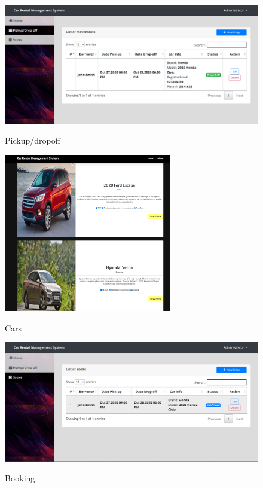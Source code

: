 \begin{figure}[H]
\centering
\caption{Pickup/dropoff}
\includegraphics[width=\textwidth,height=\textheight,keepaspectratio]{pickupdropoff-table.png}
\\[0.2in]
\label{fig:Add Teacher}
\end{figure}
\begin{figure}[H]
\centering
\caption{Cars}
\includegraphics[width=0.65\textwidth,height=\textheight,keepaspectratio]{cars.png}
\\[0.1in]
\label{fig:Student Details}
\end{figure}
\begin{figure}[H]
\centering
\caption{Booking}
\includegraphics[width=\textwidth,height=\textheight,keepaspectratio]{booking-table.png}
\\[0.2in]
\label{fig:Attendance}
\end{figure}


